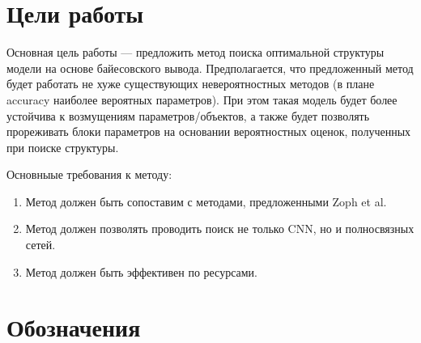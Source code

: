 \documentclass[12pt]{article}
\begin{document}
\section{Цели работы}
Основная цель работы --- предложить метод поиска оптимальной структуры модели на основе байесовского вывода.
Предполагается, что предложенный метод будет работать не хуже существующих невероятностных методов (в плане accuracy наиболее вероятных параметров).
При этом такая модель будет более устойчива к возмущениям параметров/объектов, а также будет позволять прореживать блоки параметров на основании вероятностных оценок, полученных при поиске структуры.

Основныые требования к методу:
\begin{enumerate}
\item Метод должен быть сопоставим с методами, предложенными Zoph et al.
\item Метод должен позволять проводить поиск не только CNN, но и полносвязных сетей.
\item Метод должен быть эффективен по ресурсами.

\end{enumerate}
\newpage
\section{Обозначения}
\end{document}
